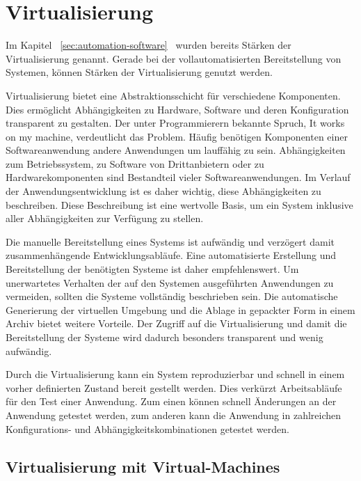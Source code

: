 \section{Virtualisierung}

Im Kapitel ~\ref{sec:automation-software}~ wurden bereits Stärken der Virtualisierung 
genannt. Gerade bei der vollautomatisierten Bereitstellung von Systemen, können Stärken der Virtualisierung genutzt werden.

Virtualisierung bietet eine Abstraktionsschicht für verschiedene Komponenten. Dies ermöglicht Abhängigkeiten zu Hardware, 
Software und deren Konfiguration transparent zu gestalten. Der unter Programmierern bekannte Spruch, \glqq It works on my
machine\grqq{}, verdeutlicht das Problem. Häufig benötigen Komponenten einer Softwareanwendung andere Anwendungen um lauffähig
zu sein. Abhängigkeiten zum Betriebssystem, zu Software von Drittanbietern oder zu Hardwarekomponenten sind Bestandteil 
vieler Softwareanwendungen. Im Verlauf der Anwendungsentwicklung ist es daher wichtig, diese Abhängigkeiten zu 
beschreiben. Diese Beschreibung ist eine wertvolle Basis, um ein System inklusive aller Abhängigkeiten zur Verfügung zu stellen.

Die manuelle Bereitstellung eines Systems ist aufwändig und verzögert damit zusammenhängende Entwicklungsabläufe. Eine 
automatisierte Erstellung und Bereitstellung der benötigten Systeme ist daher empfehlenswert. Um unerwartetes Verhalten 
der auf den Systemen ausgeführten Anwendungen zu vermeiden, sollten die Systeme vollständig beschrieben sein. Die 
automatische Generierung der virtuellen Umgebung und die Ablage in gepackter Form in einem Archiv bietet weitere 
Vorteile. Der Zugriff auf die Virtualisierung und damit die Bereitstellung der Systeme wird dadurch besonders transparent 
und wenig aufwändig.

Durch die Virtualisierung kann ein System reproduzierbar und schnell in einem vorher definierten Zustand bereit gestellt werden. Dies verkürzt Arbeitsabläufe für den Test einer Anwendung. Zum einen können schnell Änderungen an der Anwendung getestet werden, zum anderen kann die Anwendung in zahlreichen Konfigurations- und Abhängigkeitskombinationen getestet werden.

\subsection{Virtualisierung mit Virtual-Machines}

